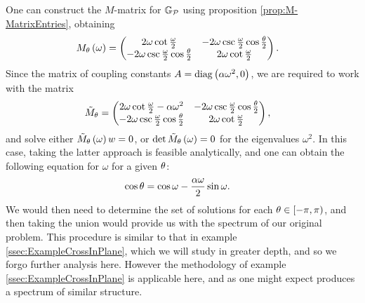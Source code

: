 One can construct the $M$-matrix for $\mathbb{G}_{\mathcal{P}}$ using proposition \ref{prop:M-MatrixEntries}, obtaining
\begin{align*}
	M_{\theta}\left( \omega \right) &= 
	\begin{pmatrix} 
		2\omega\cot\frac{\omega}{2} & -2\omega\csc\frac{\omega}{2}\cos\frac{\theta}{2} \\
		-2\omega\csc\frac{\omega}{2}\cos\frac{\theta}{2} & 2\omega\cot\frac{\omega}{2}
	\end{pmatrix}.
\end{align*}
Since the matrix of coupling constants $A = \mathrm{diag}\left( \alpha\omega^2, 0 \right)$, we are required to work with the matrix
\begin{align*}
	\tilde{M}_\theta &= 
	\begin{pmatrix}
		2\omega\cot\frac{\omega}{2} - \alpha\omega^2 & -2\omega\csc\frac{\omega}{2}\cos\frac{\theta}{2} \\
		-2\omega\csc\frac{\omega}{2}\cos\frac{\theta}{2} & 2\omega\cot\frac{\omega}{2}		
	\end{pmatrix},
\end{align*}
and solve either $\tilde{M}_\theta\left( \omega \right) w = 0$, or $\det\tilde{M}_\theta \left( \omega \right) = 0$ for the eigenvalues $\omega^2$.
In this case, taking the latter approach is feasible analytically, and one can obtain the following equation for $\omega$ for a given $\theta$:
\begin{align*}
	\cos\theta &= \cos\omega - \frac{\alpha\omega}{2}\sin\omega.
\end{align*}
We would then need to determine the set of solutions for each $\theta\in\left[-\pi, \pi\right)$, and then taking the union would provide us with the spectrum of our original problem.
This procedure is similar to that in example \ref{ssec:ExampleCrossInPlane}, which we will study in greater depth, and so we forgo further analysis here.
However the methodology of example \ref{ssec:ExampleCrossInPlane} is applicable here, and as one might expect produces a spectrum of similar structure.

